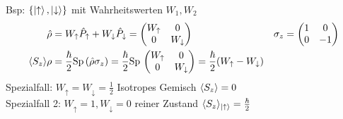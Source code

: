 	Bsp: $\{\ket{\uparrow}, \ket{\downarrow} \}$ mit Wahrheitswerten $W_1, W_2$ 
		\begin{align*}
			\hat{\rho} &= W_\uparrow \hat{P}_\uparrow + W_\downarrow \hat{P}_\downarrow =
			\begin{pmatrix}
				W_\uparrow & 0 \\
				0 & W_\downarrow 
			\end{pmatrix}&
			\sigma_z &= 
			\begin{pmatrix}
				1 & 0 \\
				0 & -1
			\end{pmatrix} \\
			\langle {S_z} \rangle \rho &= 
			\frac{\hbar}{2} \mathrm{Sp}\, (\hat{\rho} \sigma_z) =
			\frac{\hbar}{2} \mathrm{Sp}\, 
			\begin{pmatrix}
			W_\uparrow & 0 \\
			0 & W_\downarrow 
			\end{pmatrix} =
			\frac{\hbar}{2} (W_\uparrow - W_\downarrow) 
		\end{align*}
	Spezialfall: $W_\uparrow = W_\downarrow = \frac{1}{2}$ Isotropes Gemisch $\langle {S_z} \rangle = 0$
	\\
	Spezialfall 2: $W_\uparrow = 1, W_\downarrow = 0$ reiner Zustand $\langle {S_z} \rangle_{\ket{\uparrow}} = \frac{\hbar}{2}$